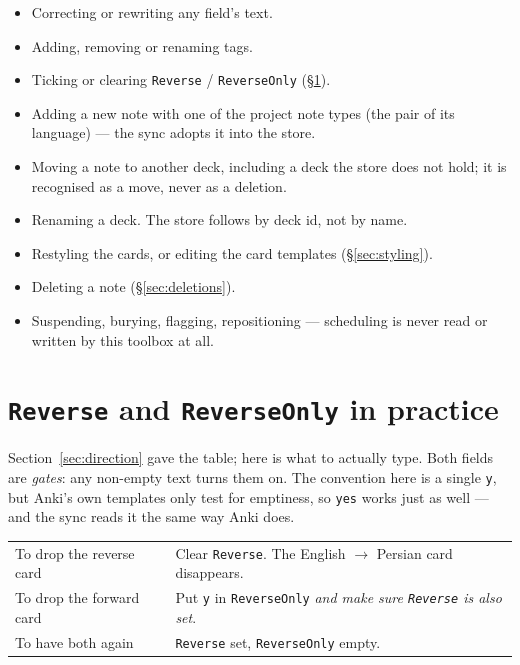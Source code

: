\documentclass[11pt,oneside]{report}
\begin{document}
\begin{itemize}
\item Correcting or rewriting any field's text.
\item Adding, removing or renaming tags.
\item Ticking or clearing \texttt{Reverse} / \texttt{ReverseOnly}
  (\S\ref{sec:revfields}).
\item Adding a new note with one of the project note types (the pair of
  its language) --- the sync adopts it into the store.
\item Moving a note to another deck, including a deck the store does not
  hold; it is recognised as a move, never as a deletion.
\item Renaming a deck. The store follows by deck id, not by name.
\item Restyling the cards, or editing the card templates
  (\S\ref{sec:styling}).
\item Deleting a note (\S\ref{sec:deletions}).
\item Suspending, burying, flagging, repositioning --- scheduling is never
  read or written by this toolbox at all.
\end{itemize}

\section{\texttt{Reverse} and \texttt{ReverseOnly} in practice}
\label{sec:revfields}

Section~\ref{sec:direction} gave the table; here is what to actually type.
Both fields are \emph{gates}: any non-empty text turns them on. The
convention here is a single \texttt{y}, but Anki's own templates only test
for emptiness, so \texttt{yes} works just as well --- and the sync reads it
the same way Anki does.

\begin{center}
\begin{tabular}{@{}p{}p{}@{}}
\toprule
\textsf{To drop the reverse card} & Clear \texttt{Reverse}. The English
  $\rightarrow$ Persian card disappears. \\
\addlinespace
\textsf{To drop the forward card} & Put \texttt{y} in \texttt{ReverseOnly}
  \emph{and make sure \texttt{Reverse} is also set}. \\
\addlinespace
\textsf{To have both again} & \texttt{Reverse} set, \texttt{ReverseOnly}
  empty. \\
\bottomrule
\end{tabular}
\end{center}
\end{document}
